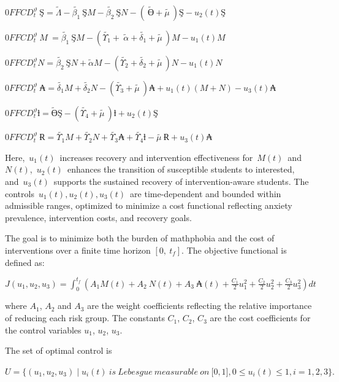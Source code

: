 \documentclass[10pt]{NSP1}
\begin{document}
\(0FFCD_{t}^{\vartheta}\ Ş = \widetilde{\Lambda} - \widetilde{\beta_{1}}\ ŞM - \widetilde{\beta_{2}}\ ŞN - \left( \ \widetilde{Ө} + \widetilde{\mu\ } \right)Ş - u_{2}(t)Ş\)

\(0FFCD_{t}^{\vartheta}\ M\ = \widetilde{\beta_{1}}\ ŞM - \left( \widetilde{\Upsilon_{1}} + \ \widetilde{\alpha} + \widetilde{\delta_{1}} + \widetilde{\mu\ } \right)M - u_{1}(t)M\)

\(0FFCD_{t}^{\vartheta}N = \widetilde{\beta_{2}}\ ŞN + \widetilde{\alpha}M - \left( \widetilde{\Upsilon_{2}} + \widetilde{\delta_{2}} + \widetilde{\mu\ } \right)N - u_{1}(t)N\)

\(0FFCD_{t}^{\vartheta}\ ₳ = \widetilde{\delta_{1}}M + \widetilde{\delta_{2}}N - \left( \widetilde{\Upsilon_{3}} + \widetilde{\mu\ } \right)₳ + u_{1}(t)(M + N) - u_{3}(t)₳\)

\(0FFCD_{t}^{\vartheta}ƚ = \widetilde{Ө}Ş - \left( \widetilde{\Upsilon_{4}} + \widetilde{\mu\ } \right)ƚ + u_{2}(t)Ş\)

\(0FFCD_{t}^{\vartheta}\ Ɍ = \widetilde{\Upsilon_{1}}M + \widetilde{\Upsilon_{2}}N + \widetilde{\Upsilon_{3}}₳ + \widetilde{\Upsilon_{4}}ƚ - \widetilde{\mu\ }Ɍ + u_{3}(t)₳\)

Here, \(u_{1}(t)\) increases recovery and intervention effectiveness for \(M(t)\) and \(N(t)\), \(u_{2}(t)\) enhances the transition of susceptible students to interested, and \(u_{3}(t)\) supports the sustained recovery of intervention-aware students. The controls \(u_{1}(t),u_{2}(t),u_{3}(t)\) are time-dependent and bounded within admissible ranges, optimized to minimize a cost functional reflecting anxiety prevalence, intervention costs, and recovery goals.

The goal is to minimize both the burden of mathphobia and the cost of interventions over a finite time horizon \(\left\lbrack 0,\ t_{f} \right\rbrack.\) The objective functional is defined as:

\(J\left( u_{1},u_{2},u_{3} \right) = \int_{0}^{t_{f}}{}\left( A_{1}M(t) + A_{2}\ N(t) + A_{3}\ ₳(t) + \frac{C_{1}}{2}u_{1}^{2} + \frac{C_{2}}{2}u_{2}^{2} + \frac{C_{3}}{2}u_{3}^{2} \right)dt\)

where \(A_{1}\), \(A_{2}\) and \(A_{3}\) are the weight coefficients reflecting the relative importance of reducing each risk group. The constants \(C_{1}\), \(C_{2}\), \(C_{3}\) are the cost coefficients for the control variables \(u_{1}\), \(u_{2}\), \(u_{3}\).

The set of optimal control is

\(U = \{\left( u_{1},u_{2},u_{3} \right) \mid u_{i}(t)\ is\ Lebesgue\ measurable\ on\ \lbrack 0,1\rbrack,0 \leq u_{i}(t) \leq 1,i = 1,2,3\}.\)
\end{document}
